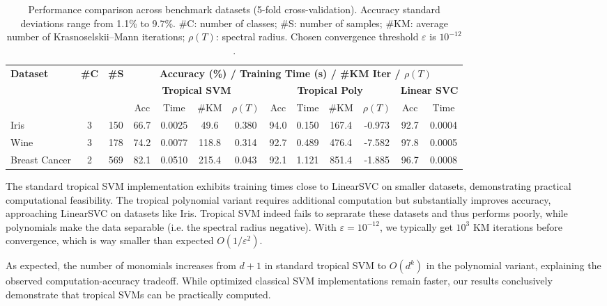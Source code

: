 \documentclass{article}
\begin{document}
\begin{table}[h]
    \centering
    \footnotesize
    \begin{tabular}{@{}l@{\hskip 4pt}c@{\hskip 4pt}c@{\hskip 8pt}ccc@{\hskip 4pt}c@{\hskip 8pt}cccc@{\hskip 8pt}cc@{}}
    \toprule
    \multirow{3}{*}{\textbf{Dataset}} & \multirow{3}{*}{\textbf{\#C}} & \multirow{3}{*}{\textbf{\#S}} & \multicolumn{10}{c}{\textbf{Accuracy (\%) / Training Time (s) / \#KM Iter / $\rho(T)$}} \\
    \cmidrule(lr){4-13}
    & & & \multicolumn{4}{c}{\textbf{Tropical SVM}} & \multicolumn{4}{c}{\textbf{Tropical Poly}} & \multicolumn{2}{c}{\textbf{Linear SVC}} \\
    \cmidrule(lr){4-7} \cmidrule(lr){8-11} \cmidrule(lr){12-13}
    & & & Acc & Time & \#KM & $\rho(T)$ & Acc & Time & \#KM & $\rho(T)$ & Acc & Time \\
    \midrule
    Iris & 3 & 150 & 66.7 & 0.0025 & 49.6 & 0.380 & 94.0 & 0.150 & 167.4 & -0.973 & 92.7 & 0.0004 \\
    Wine & 3 & 178 & 74.2 & 0.0077 & 118.8 & 0.314 & 92.7 & 0.489 & 476.4 & -7.582 & 97.8 & 0.0005 \\
    Breast Cancer & 2 & 569 & 82.1 & 0.0510 & 215.4 & 0.043 & 92.1 & 1.121 & 851.4 & -1.885 & 96.7 & 0.0008 \\
    \bottomrule
    \end{tabular}
    \vspace{0.5em}
    \caption{Performance comparison across benchmark datasets (5-fold cross-validation). Accuracy standard deviations range from 1.1\% to 9.7\%. \#C: number of classes; \#S: number of samples; \#KM: average number of Krasnoselskii--Mann iterations; $\rho(T)$: spectral radius.
    Chosen convergence threshold $\varepsilon$ is $10^{-12}$.}
    \label{tab:benchmark_results}
\end{table}

The standard tropical SVM implementation exhibits training times close to LinearSVC on smaller datasets, demonstrating practical computational feasibility. The tropical polynomial variant requires additional computation but substantially improves accuracy, approaching LinearSVC on datasets like Iris.
Tropical SVM indeed fails to seprarate these datasets and thus performs poorly, while polynomials make the data separable (i.e. the spectral radius negative).
With $\varepsilon = 10^{-12}$, we typically get $10^3$ KM iterations before convergence, which is way smaller than expected $O(1/\varepsilon^2)$.

As expected, the number of monomials increases from $d+1$ in standard tropical SVM to $O(d^k)$ in the polynomial variant, explaining the observed computation-accuracy tradeoff. While optimized classical SVM implementations remain faster, our results conclusively demonstrate that tropical SVMs can be practically computed.
\end{document}
